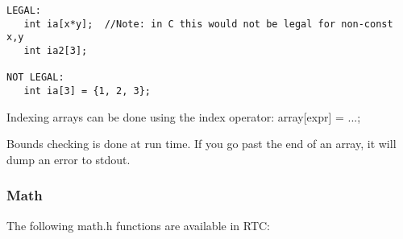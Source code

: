{\ttfamily \begin{verbatim}
LEGAL:
   int ia[x*y];  //Note: in C this would not be legal for non-const x,y
   int ia2[3];

NOT LEGAL:
   int ia[3] = {1, 2, 3};
\end{verbatim}
}

\noindent Indexing arrays can be done using the index operator:
array[expr] = ...;

\noindent Bounds checking is done at run time. If you go past the end of an
array, it will dump an error to stdout.

\subsubsection{Math}

The following math.h functions are available in RTC:

